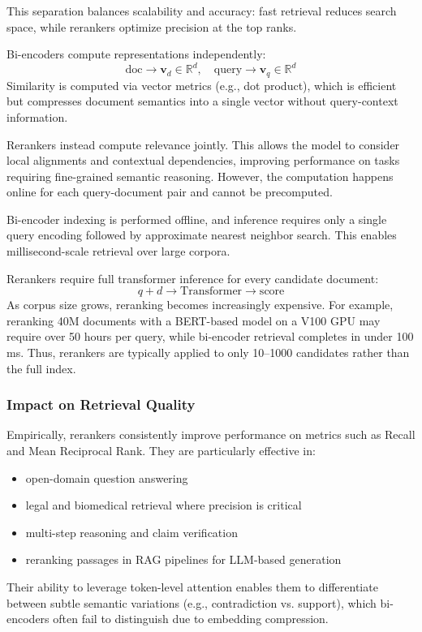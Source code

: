 This separation balances scalability and accuracy: fast retrieval reduces search space, while rerankers optimize precision at the top ranks.


Bi-encoders compute representations independently:
\[
\text{doc} \rightarrow \mathbf{v}_d \in \mathbb{R}^d, \quad \text{query} \rightarrow \mathbf{v}_q \in \mathbb{R}^d
\]
Similarity is computed via vector metrics (e.g., dot product), which is efficient but compresses document semantics into a single vector without query-context information.

Rerankers instead compute relevance jointly. This allows the model to consider local alignments and contextual dependencies, improving performance on tasks requiring fine-grained semantic reasoning. However, the computation happens online for each query-document pair and cannot be precomputed.


Bi-encoder indexing is performed offline, and inference requires only a single query encoding followed by approximate nearest neighbor search. This enables millisecond-scale retrieval over large corpora.

Rerankers require full transformer inference for every candidate document:
\[
q + d \rightarrow \text{Transformer} \rightarrow \text{score}
\]
As corpus size grows, reranking becomes increasingly expensive. For example, reranking 40M documents with a BERT-based model on a V100 GPU may require over 50 hours per query, while bi-encoder retrieval completes in under 100 ms. Thus, rerankers are typically applied to only 10–1000 candidates rather than the full index.

\subsubsection*{Impact on Retrieval Quality}

Empirically, rerankers consistently improve performance on metrics such as Recall and Mean Reciprocal Rank. They are particularly effective in:
\begin{itemize}
    \item open-domain question answering
    \item legal and biomedical retrieval where precision is critical
    \item multi-step reasoning and claim verification
    \item reranking passages in RAG pipelines for LLM-based generation
\end{itemize}

Their ability to leverage token-level attention enables them to differentiate between subtle semantic variations (e.g., contradiction vs. support), which bi-encoders often fail to distinguish due to embedding compression.

